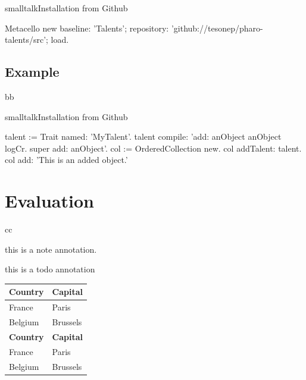 \documentclass[10pt,twoside,english]{_support/latex/sbabook/sbabook}
\begin{document}
\begin{listing}[float, label=install]{smalltalk}{Installation from Github}

Metacello new
  baseline: 'Talents';
  repository: 'github://tesonep/pharo-talents/src';
  load.
\end{listing}
\subsection{Example}
bb

\begin{listing}[float, label=talent-example]{smalltalk}{Installation from Github}

talent := Trait named: 'MyTalent'.
talent compile: 'add: anObject
anObject logCr.
super add: anObject'.
col := OrderedCollection new.
col addTalent: talent.
col add: 'This is an added object.'
\end{listing}
\section{Evaluation}
cc

\begin{note}
this is a note annotation.
\end{note}

\begin{todo}
this is a todo annotation
\end{todo}

\begin{tabular}{ll}
\toprule
\textbf{Country} & \textbf{Capital} \\
\midrule
France & Paris \\
Belgium & Brussels \\
\textbf{Country} & \textbf{Capital} \\
\midrule
France & Paris \\
Belgium & Brussels \\
\bottomrule
\end{tabular}






\backmatter

\end{document}
